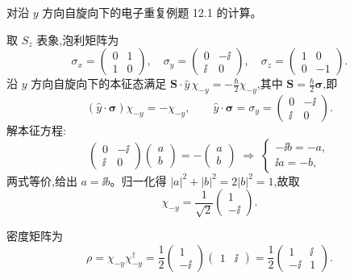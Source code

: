 \begin{question}
对沿 $y$ 方向自旋向下的电子重复例题 12.1 的计算。
\begin{solution}
取 $S_z$ 表象,泡利矩阵为
\[
\sigma_x = \begin{pmatrix}0&1\\1&0\end{pmatrix},\quad
\sigma_y = \begin{pmatrix}0&-\ii\\\ii&0\end{pmatrix},\quad
\sigma_z = \begin{pmatrix}1&0\\0&-1\end{pmatrix}.
\]
沿 $y$ 方向自旋向下的本征态满足 $\mathbf S\cdot\hat y\,\chi_{-y} = -\frac{\hbar}{2}\chi_{-y}$,其中 $\mathbf S = \frac{\hbar}{2}\boldsymbol\sigma$,即
\[
(\hat y\cdot\boldsymbol\sigma)\chi_{-y} = -\chi_{-y},\qquad
\hat y\cdot\boldsymbol\sigma = \sigma_y = \begin{pmatrix}0&-\ii\\\ii&0\end{pmatrix}.
\]
解本征方程:
\[
\begin{pmatrix}0&-\ii\\\ii&0\end{pmatrix}\begin{pmatrix}a\\b\end{pmatrix} = -\begin{pmatrix}a\\b\end{pmatrix}
\;\Longrightarrow\;
\begin{cases}
-\ii b = -a,\\
\ii a = -b,
\end{cases}
\]
两式等价,给出 $a = \ii b$。归一化得 $|a|^2+|b|^2 = 2|b|^2 = 1$,故取
\[
\chi_{-y} = \frac{1}{\sqrt{2}}\begin{pmatrix}1\\-\ii\end{pmatrix}.
\]

密度矩阵为
\[
\rho = \chi_{-y}\chi_{-y}^\dagger
= \frac{1}{2}\begin{pmatrix}1\\-\ii\end{pmatrix}\begin{pmatrix}1&\ii\end{pmatrix}
= \frac{1}{2}\begin{pmatrix}1 & \ii\\ -\ii & 1\end{pmatrix}.
\]


\end{solution}
\end{question}
